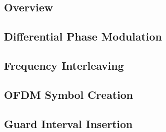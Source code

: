 \documentclass[class=report,11pt,crop=false]{standalone}
\begin{document}
\subsection{Overview}
\subsection{Differential Phase Modulation}
\blindmathpaper
\subsection{Frequency Interleaving}
\blindmathpaper
\subsection{OFDM Symbol Creation}
\blindmathpaper
\subsection{Guard Interval Insertion}
\blindmathpaper

\ifstandalone

\fi
\end{document}

